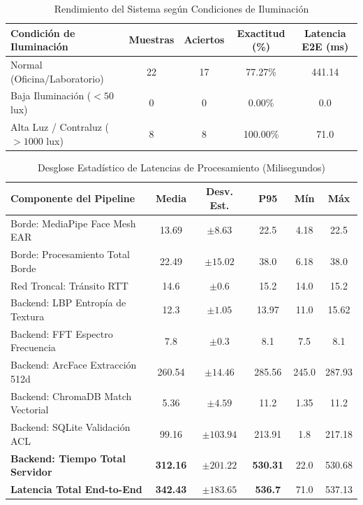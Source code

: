 \begin{table}[htbp]
\centering
\caption{Rendimiento del Sistema según Condiciones de Iluminación}
\label{tab:robustez_ambiental}
\begin{tabular}{l|c|c|c|c}
\hline
\textbf{Condición de Iluminación} & \textbf{Muestras} & \textbf{Aciertos} & \textbf{Exactitud (\%)} & \textbf{Latencia E2E (ms)} \\ \hline
Normal (Oficina/Laboratorio) & 22 & 17 & 77.27\% & 441.14 \\
Baja Iluminación ($< 50$ lux) & 0 & 0 & 0.00\% & 0.0 \\
Alta Luz / Contraluz ($> 1000$ lux) & 8 & 8 & 100.00\% & 71.0 \\ \hline
\end{tabular}
\end{table}

\begin{table}[htbp]
\centering
\caption{Desglose Estadístico de Latencias de Procesamiento (Milisegundos)}
\label{tab:latencias_pipeline}
\begin{tabular}{l|c|c|c|c|c}
\hline
\textbf{Componente del Pipeline} & \textbf{Media} & \textbf{Desv. Est.} & \textbf{P95} & \textbf{Mín} & \textbf{Máx} \\ \hline
Borde: MediaPipe Face Mesh EAR & 13.69 & $\pm 8.63$ & 22.5 & 4.18 & 22.5 \\
Borde: Procesamiento Total Borde & 22.49 & $\pm 15.02$ & 38.0 & 6.18 & 38.0 \\
Red Troncal: Tránsito RTT & 14.6 & $\pm 0.6$ & 15.2 & 14.0 & 15.2 \\
Backend: LBP Entropía de Textura & 12.3 & $\pm 1.05$ & 13.97 & 11.0 & 15.62 \\
Backend: FFT Espectro Frecuencia & 7.8 & $\pm 0.3$ & 8.1 & 7.5 & 8.1 \\
Backend: ArcFace Extracción 512d & 260.54 & $\pm 14.46$ & 285.56 & 245.0 & 287.93 \\
Backend: ChromaDB Match Vectorial & 5.36 & $\pm 4.59$ & 11.2 & 1.35 & 11.2 \\
Backend: SQLite Validación ACL & 99.16 & $\pm 103.94$ & 213.91 & 1.8 & 217.18 \\ \hline
\textbf{Backend: Tiempo Total Servidor} & \textbf{312.16} & $\pm 201.22$ & \textbf{530.31} & 22.0 & 530.68 \\ \hline
\textbf{Latencia Total End-to-End} & \textbf{342.43} & $\pm 183.65$ & \textbf{536.7} & 71.0 & 537.13 \\ \hline
\end{tabular}
\end{table}

